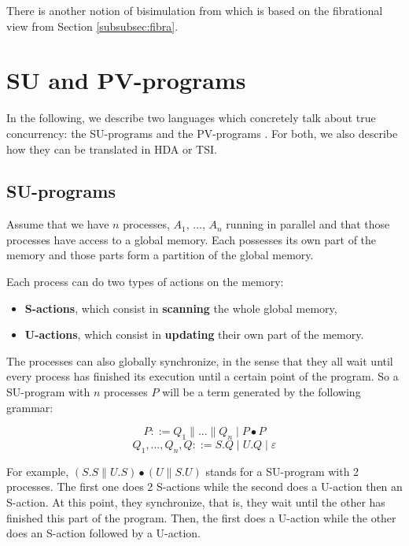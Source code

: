 There is another notion of bisimulation from \cite{fahrenberg14} which is based on the fibrational view from Section \ref{subsubsec:fibra}.
	



\section{SU and PV-programs}
\label{sec:supv}

In the following, we describe two languages which concretely talk about true concurrency: the SU-programs \cite{afek90} and the PV-programs \cite{dijkstra65}. For both, we also describe how they can be translated in HDA or TSI.


	\subsection{SU-programs}

Assume that we have $n$ processes, $A_1$, ..., $A_n$ running in parallel and that those processes have access to a global memory. Each possesses its own part of the memory and those parts form a partition of the global memory.

				\begin{figure}[H]
					\begin{center}
    						
  					\end{center}
				\end{figure}

Each process can do two types of actions on the memory:
\begin{itemize}
	\item \textbf{S-actions}, which consist in \textbf{scanning} the whole global memory,
	\item \textbf{U-actions}, which consist in \textbf{updating} their own part of the memory.
\end{itemize}

The processes can also globally synchronize, in the sense that they all wait until every process has finished its execution until a certain point of the program. So a SU-program with $n$ processes $P$ will be a term generated by the following grammar:

$$P ::= Q_1\parallel \ldots \parallel Q_n \mid P\bullet P$$
$$Q_1, \ldots, Q_n, Q ::= S.Q \mid U.Q \mid \varepsilon$$

For example, $(S.S\parallel U.S)\bullet(U\parallel S.U)$ stands for a SU-program with 2 processes. The first one does 2 S-actions while the second does a U-action then an S-action. At this point, they synchronize, that is, they wait until the other has finished this part of the program. Then, the first does a U-action while the other does an S-action followed by a U-action. 

